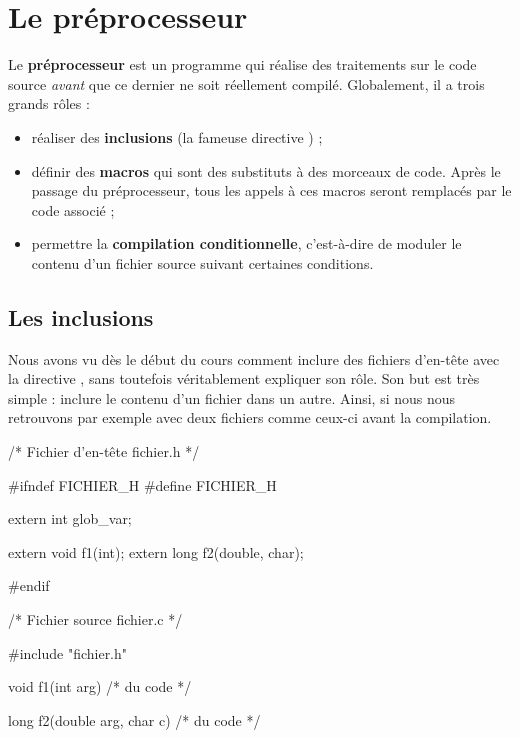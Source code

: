 \chapter{Le préprocesseur}
\label{le-preprocesseur}

Le \textbf{préprocesseur} est un programme qui réalise
des traitements sur le code source \emph{avant} que ce dernier ne soit
réellement compilé. Globalement, il a trois grands rôles :

\begin{itemize}
\item
  réaliser des \textbf{inclusions} (la fameuse directive
  ) ;
\item
  définir des \textbf{macros} qui sont des substituts à des morceaux de
  code. Après le passage du préprocesseur, tous les appels à ces macros
  seront remplacés par le code associé ;
\item
  permettre la \textbf{compilation conditionnelle}, c'est-à-dire de
  moduler le contenu d'un fichier source suivant certaines
  conditions.
\end{itemize}
  
\section{Les inclusions}
\label{les-inclusions}

Nous avons vu dès le début du cours comment inclure des fichiers d'en-tête
avec la directive , sans toutefois véritablement
expliquer son rôle. Son but est très simple : inclure le contenu d'un
fichier dans un autre. Ainsi, si nous nous retrouvons par exemple avec
deux fichiers comme ceux-ci avant la compilation.

\begin{C}
/* Fichier d'en-tête fichier.h */

#ifndef FICHIER_H
#define FICHIER_H

extern int glob_var;

extern void f1(int);
extern long f2(double, char);

#endif
\end{C}

\begin{C}
/* Fichier source fichier.c */

#include "fichier.h"

void f1(int arg)
{
    /* du code */
}

long f2(double arg, char c)
{
    /* du code */
}
\end{C}

